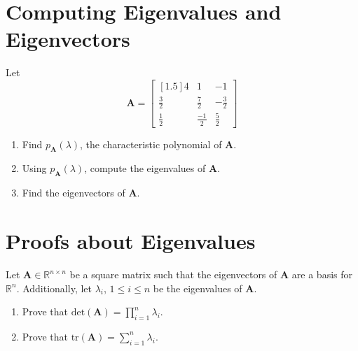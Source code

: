 \documentclass{article}
\begin{document}
\section{Computing Eigenvalues and Eigenvectors}
Let $$\mathbf{A} = \begin{bmatrix}[1.5] 4 & 1 & -1 \\ \frac{3}{2} & \frac{7}{2} & -\frac{3}{2} \\ \frac{1}{2} & \frac{-1}{2} & \frac{5}{2} \end{bmatrix}$$
\begin{enumerate}
\item Find $p_{\mathbf{A}}(\lambda)$, the characteristic polynomial of $\mathbf{A}$.
\item Using $p_{\mathbf{A}}(\lambda)$, compute the eigenvalues of $\mathbf{A}$.
\item Find the eigenvectors of $\mathbf{A}$.
\end{enumerate}

\section{Proofs about Eigenvalues}
\noindent Let $\mathbf{A} \in \mathbb{R}^{n \times n}$ be a square matrix such that the eigenvectors of $\mathbf{A}$ are a basis for $\mathbb{R}^n$. Additionally, let $\lambda_i$, $1 \leq i \leq n$ be the eigenvalues of $\mathbf{A}$.
\begin{enumerate}
\item Prove that $\text{det}(\mathbf{A}) = \prod\limits_{i = 1}^n \lambda_i$.
\item Prove that $\text{tr}(\mathbf{A}) = \sum\limits_{i = 1}^n \lambda_i$.
\end{enumerate}
\end{document}
